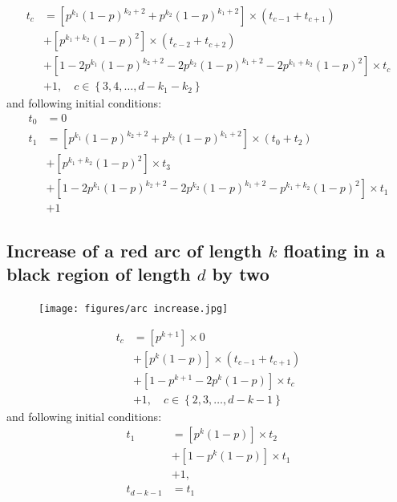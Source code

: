 \documentclass[]{book}
\theoremstyle{definition}
\begin{document}
\begin{equation}
\begin{split}
    t_c &= \left[p^{k_1}\left( 1-p \right)^{k_2+2} + p^{k_2}\left( 1-p \right)^{k_1+2} \right] \times \left( t_{c-1} + t_{c+1} \right) \\
    &+ \left[ p^{k_1+k_2}\left( 1-p \right)^2 \right] \times \left( t_{c-2}+t_{c+2} \right) \\
    &+ \left[ 1 - 2p^{k_1}\left( 1-p \right)^{k_2+2} - 2p^{k_2}\left( 1-p \right)^{k_1+2} - 2p^{k_1+k_2}\left( 1-p \right)^2 \right] \times t_c \\
    &+ 1, \quad c \in \left\{ 3, 4, \hdots, d - k_1 - k_2 \right\}
\end{split}
\end{equation}
and following initial conditions:
\begin{equation}
\begin{split}
    t_0 &= 0 \\
    t_1 &= \left[p^{k_1}\left( 1-p \right)^{k_2+2} + p^{k_2}\left( 1-p \right)^{k_1+2} \right] \times \left( t_0 + t_2 \right) \\
    &+ \left[ p^{k_1+k_2}\left( 1-p \right)^2 \right] \times t_3 \\
    &+ \left[ 1 - 2p^{k_1}\left( 1-p \right)^{k_2+2} - 2p^{k_2}\left( 1-p \right)^{k_1+2} - p^{k_1+k_2}\left( 1-p \right)^2 \right] \times t_1 \\
    &+ 1
\end{split}
\end{equation}

\subsection{Increase of a red arc of length $k$ floating in a black region of length $d$ by two}
\begin{figure}[H]
    \centering\texttt{[image: figures/arc increase.jpg]}
    \caption{}
\end{figure}

\begin{equation}
\begin{split}
    t_c &= \left[p^{k+1} \right] \times 0 \\
    &+ \left[ p^k\left( 1-p \right) \right] \times \left( t_{c-1} + t_{c+1} \right) \\
    &+ \left[1 - p^{k+1} - 2p^k\left( 1-p \right) \right] \times t_c \\
    &+ 1, \quad c \in \left\{ 2, 3, \hdots, d - k - 1 \right\}
\end{split}
\end{equation}
and following initial conditions:
\begin{equation}
\begin{split}
    t_1 &= \left[p^k\left( 1-p \right) \right] \times t_2 \\
    &+ \left[ 1 - p^k\left( 1-p \right) \right] \times t_1 \\
    &+ 1, \\
    t_{d-k-1} &= t_1
\end{split}
\end{equation}
\end{document}

